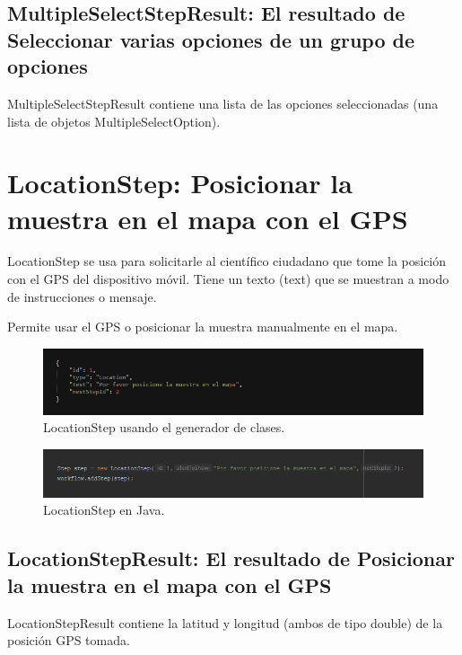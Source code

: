 \subsection{MultipleSelectStepResult: El resultado de Seleccionar varias opciones de un grupo de opciones}
MultipleSelectStepResult contiene una lista de las opciones seleccionadas (una lista de objetos MultipleSelectOption).





\section{LocationStep: Posicionar la muestra en el mapa con el GPS}
LocationStep se usa para solicitarle al científico ciudadano que tome la posición con el GPS del dispositivo móvil. Tiene un texto (text) que se muestran a modo de instrucciones o mensaje. 

Permite usar el GPS o posicionar la muestra manualmente en el mapa.

\begin{figure}[H]
  \centering
    \includegraphics[scale=0.6]{50-anexos/C-steps/location_json.png} 
    \caption{LocationStep usando el generador de clases.}
\end{figure}	

\begin{figure}[H]
  \centering
    \includegraphics[scale=0.6]{50-anexos/C-steps/location_java.png} 
    \caption{LocationStep en Java.}
\end{figure}

\subsection{LocationStepResult: El resultado de Posicionar la muestra en el mapa con el GPS}
LocationStepResult contiene la latitud y longitud (ambos de tipo double) de la posición GPS tomada.






